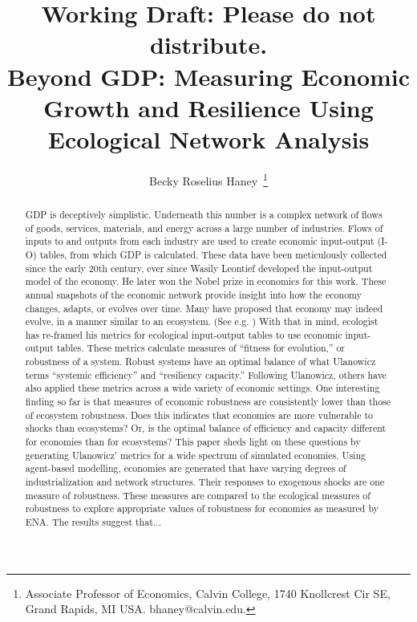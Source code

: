 \documentclass{article}
\begin{document}
 

\title{\textbf{Working Draft: Please do not distribute.}\\Beyond GDP: Measuring Economic Growth and Resilience
Using Ecological Network Analysis}
\author{Becky Roselius Haney~\footnote{Associate 
Professor of Economics, Calvin College, 1740 Knollcrest Cir SE, Grand Rapids, MI USA.
bhaney@calvin.edu.}}

\maketitle
\thispagestyle{empty} 

\begin{abstract} 
GDP is deceptively simplistic. Underneath this number
is a complex network of flows of goods, services, materials, and energy 
across
a large number of industries. Flows
of inputs to and outputs from each industry are used 
to create economic input-output (I-O) tables, from which
GDP is calculated.
These data have been meticulously collected
since the early 20th century, ever since Wasily Leontief developed
the input-output model of the economy. He later won the Nobel
prize in economics for this work.
These annual snapshots of the economic network 
provide insight into how the economy changes,
adapts, or evolves
over time. Many have proposed that economy may indeed evolve,
in a manner similar to an ecosystem. (See e.g. \cite{nelson_evolutionary_1985,arthur_complexity_1999,durlauf_complexity_2005, colander_complexity_2014})
With that in mind, ecologist \citet{ulanowicz_quantifying_2009} has
re-framed his metrics for ecological input-output tables
to use economic input-output tables. These metrics calculate 
measures of ``fitness for
evolution,'' or robustness of a system. 
Robust systems
have an optimal balance of what
Ulanowicz terms ``systemic
efficiency'' and ``resiliency capacity.'' 
Following Ulanowicz,
others have also applied 
these metrics  across a wide variety of economic settings. One
interesting finding so far is that  measures of economic robustness are
consistently
lower than those of ecosystem robustness. Does
this indicates that economies are
 more vulnerable to shocks than ecosystems? Or, is
the optimal balance of efficiency and capacity 
different for economies than for ecosystems? This paper 
sheds light on these questions by generating
Ulanowicz' metrics for a wide spectrum of simulated economies.
Using agent-based modelling, economies are generated that have varying
degrees of
industrialization and network structures. Their responses to
exogenous shocks are one measure of robustness. These
measures are compared to the ecological measures of robustness
to explore appropriate values of robustness for
economies as measured by ENA. The results suggest that... 
 

\end{abstract} 
\end{document}
